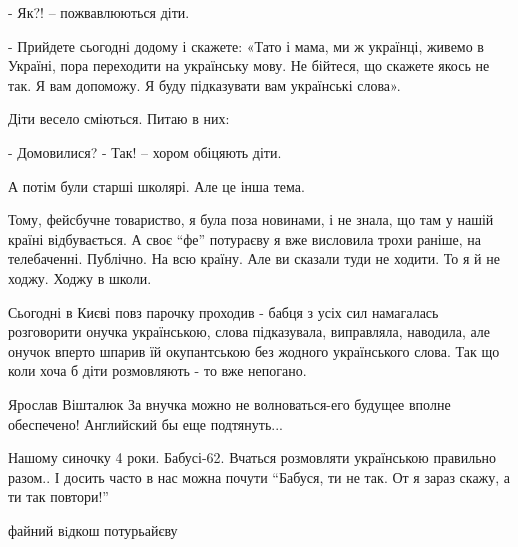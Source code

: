 - Як?! – пожвавлюються діти.

- Прийдете сьогодні додому і скажете: «Тато і мама, ми ж українці, живемо в
Україні, пора переходити на українську мову. Не бійтеся, що скажете якось не
так. Я вам допоможу. Я буду підказувати вам українські слова». 

Діти весело сміються. Питаю в них:

- Домовилися? 
- Так! – хором обіцяють діти. 

А потім були старші школярі. Але це інша тема.  

Тому, фейсбучне товариство, я була поза новинами, і не знала, що там у нашій
країні відбувається. А своє \enquote{фе} потураєву я вже висловила трохи раніше, на
телебаченні. Публічно. На всю країну. Але ви сказали туди не ходити. То я й не
ходжу. Ходжу в школи.

\begin{itemize}

Сьогодні в Києві повз парочку проходив - бабця з усіх сил намагалась
розговорити онучка українською, слова підказувала, виправляла, наводила, але
онучок вперто шпарив їй окупантською без жодного українського слова.  Так що
коли хоча б діти розмовляють - то вже непогано.


Ярослав Вішталюк За внучка можно не волноваться-его будущее вполне обеспечено! Английский бы еще подтянуть...


Нашому синочку 4 роки. Бабусі-62. Вчаться розмовляти українською правильно
разом..  І досить часто в нас можна почути \enquote{Бабуся, ти не так. От я
зараз скажу, а ти так повтори!}


файний вiдкош потурьайєву

\end{itemize}
